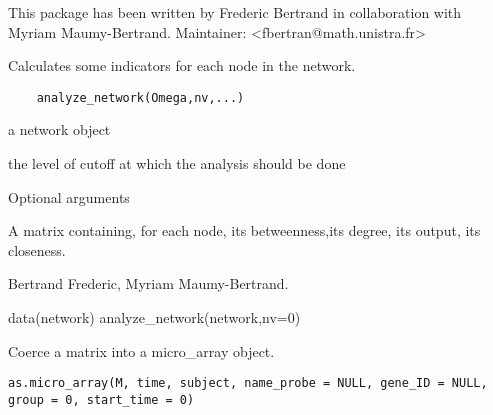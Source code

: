 \documentclass[a4paper]{book}
\begin{document}
%
\begin{Author}\relax
This package has been written by Frederic Bertrand in collaboration with Myriam Maumy-Bertrand.
Maintainer:  <fbertran@math.unistra.fr>
\end{Author}
%
\begin{Description}\relax
Calculates some indicators for each node in the network.
\end{Description}
%
\begin{Usage}
\begin{verbatim}
	analyze_network(Omega,nv,...)
\end{verbatim}
\end{Usage}
%
\begin{Arguments}
\begin{ldescription}
\item[\code{Omega}] a network object
\item[\code{nv}] the level of cutoff at which the analysis should be done	
\item[\code{...}] Optional arguments
\end{ldescription}
\end{Arguments}
%
\begin{Value}
A matrix containing, for each node, its betweenness,its degree, its output, its closeness.
\end{Value}
%
\begin{Author}\relax
Bertrand Frederic, Myriam Maumy-Bertrand.
\end{Author}
%
\begin{Examples}
\begin{ExampleCode}
data(network)
analyze_network(network,nv=0)
\end{ExampleCode}
\end{Examples}
%
\begin{Description}\relax
Coerce a matrix into a micro\_array object.
\end{Description}
%
\begin{Usage}
\begin{verbatim}
as.micro_array(M, time, subject, name_probe = NULL, gene_ID = NULL, 
group = 0, start_time = 0)
\end{verbatim}
\end{Usage}
\end{document}
